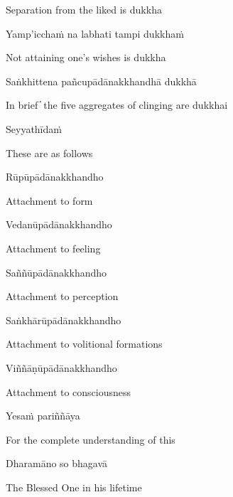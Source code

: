 \begin{cprenglish}
  Separation from the liked is dukkha
\end{cprenglish}

Yamp'icchaṁ na labhati tampi dukkhaṁ

\begin{cprenglish}
  Not attaining one’s wishes is dukkha
\end{cprenglish}

Saṅkhittena pañcupādānakkhandhā dukkhā

\begin{cprenglish}
  In brief  ̓  the five aggregates of clinging are dukkhai
\end{cprenglish}

Seyyathīdaṁ

\begin{cprenglish}
  These are as follows
\end{cprenglish}

Rūpūpādānakkhandho

\begin{cprenglish}
  Attachment to form
\end{cprenglish}

Vedanūpādānakkhandho

\begin{cprenglish}
  Attachment to feeling
\end{cprenglish}

Saññūpādānakkhandho

\begin{cprenglish}
  Attachment to perception
\end{cprenglish}

Saṅkhārūpādānakkhandho

\begin{cprenglish}
  Attachment to volitional formations
\end{cprenglish}

Viññāṇūpādānakkhandho

\begin{cprenglish}
  Attachment to consciousness
\end{cprenglish}

Yesaṁ pariññāya

\begin{cprenglish}
  For the complete understanding of this
\end{cprenglish}

Dharamāno so bhagavā

\begin{cprenglish}
  The Blessed One in his lifetime
\end{cprenglish}

